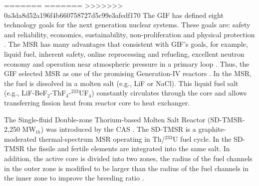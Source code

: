 
=======
=======
>>>>>>> 0a3da8d52a196f4b660758727d5c99e3afedf170
The \gls{GIF} has defined eight technology goals for the next generation
nuclear systems. These goals are: safety and reliability, economics,
sustainability, non-proliferation and physical protection
\cite{doe2002technology}. The \gls{MSR} has many advantages that consistent
with \gls{GIF}'s goals, for example, liquid fuel, inherent safety, online
reprocessing and refueling, excellent neutron economy and operation near
atmospheric
pressure in a primary loop \cite{siemer2015molten,rosenthal1970molten}.
Thus, the \gls{GIF} selected \gls{MSR} as one of the promising Generation-IV
reactors \cite{doe2002technology,pioro2016handbook}.
In the \gls{MSR}, the fuel is dissolved in a molten salt (e.g., LiF or NaCl).
This liquid fuel salt (e.g., LiF-BeF$_2$-ThF$_4$-$^{233}$UF$_4$) constantly
circulates through the core and allows transferring fission heat from reactor
core to heat exchanger.

The Single-fluid Double-zone Thorium-based Molten Salt Reactor (SD-TMSR-2,250
MW$_{th}$) was introduced by the \gls{CAS} \cite{li_optimization_2018}. The
SD-TMSR
is a graphite-moderated thermal-spectrum \gls{MSR} operating in Th/$^{233}$U
fuel cycle. In the SD-TMSR the fissile and fertile elements are integrated
into the same salt. In addition, the active core is divided into two zones,
the radius of the fuel channels in the outer zone is modified to be larger
than the radius of the fuel channels in the inner zone to improve the breeding
ratio \cite{nuttin2005potential,li_optimization_2018}.

